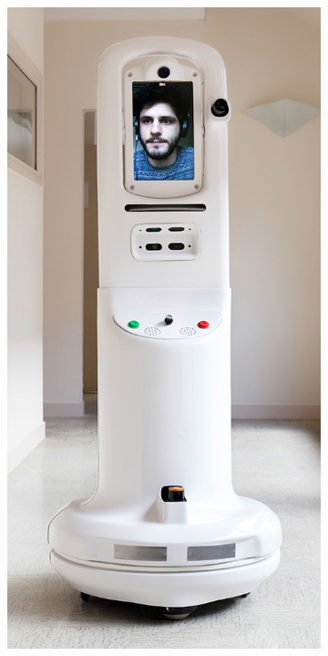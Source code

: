\documentclass[letterpaper, 10 pt, conference]{ieeeconf}
\begin{document}
  	\begin{figure}[tbh]
	\centering
      \begin{subfigure}[b]{0.35\columnwidth}
          \includegraphics[scale = 0.15]{images/robot2.jpg}


\end{subfigure}
\end{figure}
\end{document}
